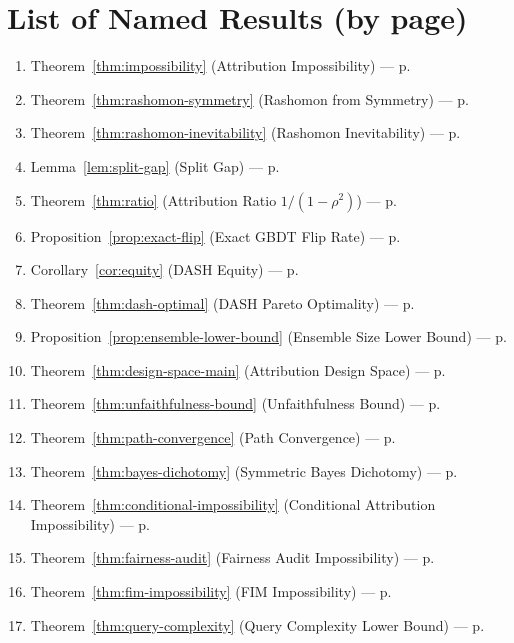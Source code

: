\documentclass{article}
\begin{document}
\section*{List of Named Results (by page)}
\begin{enumerate}
\item Theorem~\ref{thm:impossibility} (Attribution Impossibility) --- p.\pageref{thm:impossibility}
\item Theorem~\ref{thm:rashomon-symmetry} (Rashomon from Symmetry) --- p.\pageref{thm:rashomon-symmetry}
\item Theorem~\ref{thm:rashomon-inevitability} (Rashomon Inevitability) --- p.\pageref{thm:rashomon-inevitability}
\item Lemma~\ref{lem:split-gap} (Split Gap) --- p.\pageref{lem:split-gap}
\item Theorem~\ref{thm:ratio} (Attribution Ratio $1/(1-\rho^2)$) --- p.\pageref{thm:ratio}
\item Proposition~\ref{prop:exact-flip} (Exact GBDT Flip Rate) --- p.\pageref{prop:exact-flip}
\item Corollary~\ref{cor:equity} (DASH Equity) --- p.\pageref{cor:equity}
\item Theorem~\ref{thm:dash-optimal} (DASH Pareto Optimality) --- p.\pageref{thm:dash-optimal}
\item Proposition~\ref{prop:ensemble-lower-bound} (Ensemble Size Lower Bound) --- p.\pageref{prop:ensemble-lower-bound}
\item Theorem~\ref{thm:design-space-main} (Attribution Design Space) --- p.\pageref{thm:design-space-main}
\item Theorem~\ref{thm:unfaithfulness-bound} (Unfaithfulness Bound) --- p.\pageref{thm:unfaithfulness-bound}
\item Theorem~\ref{thm:path-convergence} (Path Convergence) --- p.\pageref{thm:path-convergence}
\item Theorem~\ref{thm:bayes-dichotomy} (Symmetric Bayes Dichotomy) --- p.\pageref{thm:bayes-dichotomy}
\item Theorem~\ref{thm:conditional-impossibility} (Conditional Attribution Impossibility) --- p.\pageref{thm:conditional-impossibility}
\item Theorem~\ref{thm:fairness-audit} (Fairness Audit Impossibility) --- p.\pageref{thm:fairness-audit}
\item Theorem~\ref{thm:fim-impossibility} (FIM Impossibility) --- p.\pageref{thm:fim-impossibility}
\item Theorem~\ref{thm:query-complexity} (Query Complexity Lower Bound) --- p.\pageref{thm:query-complexity}
\end{enumerate}
\end{document}
